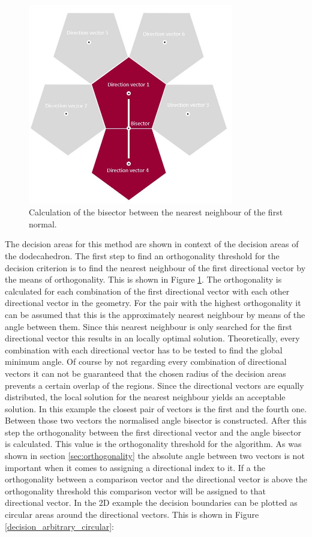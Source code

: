 \begin{figure}[H]
    \centering
    \includegraphics[width=0.8\textwidth]{Graphics/decision_area_calc_bisector.jpg}
    \caption{Calculation of the bisector between the nearest neighbour of the first normal.}
    \label{decision_arbitrary_bisec}
\end{figure}

The decision areas for this method are shown in context of the decision areas of the dodecahedron. The first step to find an orthogonality threshold for the decision criterion is to find the nearest neighbour of the first directional vector by the means of orthogonality. This is shown in Figure \ref{decision_arbitrary_bisec}. The orthogonality is calculated for each combination of the first directional vector with each other directional vector in the geometry. For the pair with the highest orthogonality it can be assumed that this is the approximately nearest neighbour by means of the angle between them. Since this nearest neighbour is only searched for the first directional vector this results in an locally optimal solution. Theoretically, every combination with each directional vector has to be tested to find the global minimum angle. Of course by not regarding every combination of directional vectors it can not be guaranteed that the chosen radius of the decision areas prevents a certain overlap of the regions. Since the directional vectors are equally distributed, the local solution for the nearest neighbour yields an acceptable solution. In this example the closest pair of vectors is the first and the fourth one. Between those two vectors the normalised angle bisector is constructed. After this step the orthogonality between the first directional vector and the angle bisector is calculated. This value is the orthogonality threshold for the algorithm. As was shown in section \ref{sec:orthogonality} the absolute angle between two vectors is not important when it comes to assigning a directional index to it. If a the orthogonality between a comparison vector and the directional vector is above the orthogonality threshold this comparison vector will be assigned to that directional vector.
In the 2D example the decision boundaries can be plotted as circular areas around the directional vectors. This is shown in Figure \ref{decision_arbitrary_circular}:


